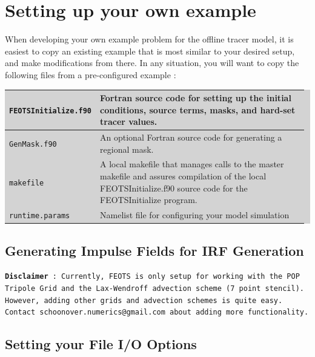 \documentclass{softwaremanual}
\begin{document}
\section{Setting up your own example}
 When developing your own example problem for the offline tracer model, it is easiest to copy an existing example that is most similar to your desired setup, and make modifications from there. In any situation, you will want to copy the following files from a pre-configured example :
 
 \vspace{0.5cm}
 \begin{flushleft}
\begingroup\setlength{\fboxsep}{0pt}
  \colorbox{lightgray}{
    \begin{tabular}{p{0.25\linewidth} | p{0.725\linewidth}}
    \toprule
    \texttt{FEOTSInitialize.f90} & Fortran source code for setting up the initial conditions, source terms, masks, and hard-set tracer values.\\
    \midrule
    \texttt{GenMask.f90} & An optional Fortran source code for generating a regional mask.\\
    \midrule
    \texttt{makefile} & A local makefile that manages calls to the master makefile and assures compilation of the local FEOTSInitialize.f90 source code for the FEOTSInitialize program. \\
    \midrule
    \texttt{runtime.params} & Namelist file for configuring your model simulation\\
    \bottomrule
\end{tabular}
}\endgroup
\end{flushleft}
\vspace{0.5cm}

\subsection{Generating Impulse Fields for IRF Generation}
\texttt{\textbf{Disclaimer} : Currently, FEOTS is only setup for working with the POP Tripole Grid and the Lax-Wendroff advection scheme (7 point stencil). However, adding other grids and advection schemes is quite easy. Contact schoonover.numerics@gmail.com about adding more functionality.} \\

 

\subsection{Setting your File I/O Options}
\end{document}
